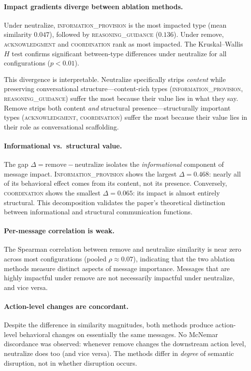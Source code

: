 \paragraph{Impact gradients diverge between ablation methods.}
Under neutralize, \textsc{information\_provision} is the most impacted type (mean similarity $0.047$), followed by \textsc{reasoning\_guidance} ($0.136$).  Under remove, \textsc{acknowledgment} and \textsc{coordination} rank as most impacted.  The Kruskal--Wallis $H$ test confirms significant between-type differences under neutralize for all configurations ($p < 0.01$).

This divergence is interpretable.  Neutralize specifically strips \emph{content} while preserving conversational structure---content-rich types (\textsc{information\_provision}, \textsc{reasoning\_guidance}) suffer the most because their value lies in what they say.  Remove strips both content \emph{and} structural presence---structurally important types (\textsc{acknowledgment}, \textsc{coordination}) suffer the most because their value lies in their role as conversational scaffolding.

\paragraph{Informational vs.\ structural value.}
The gap $\Delta = \text{remove} - \text{neutralize}$ isolates the \emph{informational} component of message impact.  \textsc{Information\_provision} shows the largest $\Delta = 0.468$: nearly all of its behavioral effect comes from its content, not its presence.  Conversely, \textsc{coordination} shows the smallest $\Delta = 0.065$: its impact is almost entirely structural.  This decomposition validates the paper's theoretical distinction between informational and structural communication functions.

\paragraph{Per-message correlation is weak.}
The Spearman correlation between remove and neutralize similarity is near zero across most configurations (pooled $\rho \approx 0.07$), indicating that the two ablation methods measure distinct aspects of message importance.  Messages that are highly impactful under remove are not necessarily impactful under neutralize, and vice versa.

\paragraph{Action-level changes are concordant.}
Despite the difference in similarity magnitudes, both methods produce action-level behavioral changes on essentially the same messages.  No McNemar discordance was observed: whenever remove changes the downstream action level, neutralize does too (and vice versa).  The methods differ in \emph{degree} of semantic disruption, not in whether disruption occurs.

